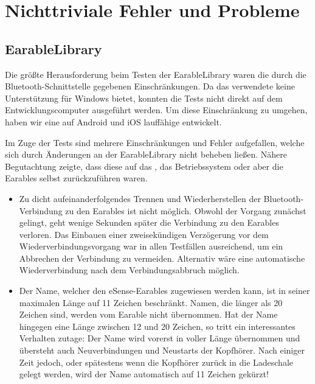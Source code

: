 \documentclass[../implementierung.tex]{subfiles}
\begin{document}
\section{Nichttriviale Fehler und Probleme}
\subsection{EarableLibrary}
Die größte Herausforderung beim Testen der EarableLibrary waren die durch die Bluetooth-Schnittstelle gegebenen Einschränkungen.
Da das verwendete  keine Unterstützung für Windows bietet, konnten die Tests nicht direkt auf dem Entwicklungscomputer ausgeführt werden.
Um diese Einschränkung zu umgehen, haben wir eine auf Android und iOS lauffähige  entwickelt.

Im Zuge der Tests sind mehrere Einschränkungen und Fehler aufgefallen, welche sich durch Änderungen an der EarableLibrary nicht beheben ließen.
Nähere Begutachtung zeigte, dass diese auf das , das Betriebssystem oder aber die Earables selbst zurückzuführen waren.
\begin{itemize}
\item Zu dicht aufeinanderfolgendes Trennen und Wiederherstellen der Bluetooth-Verbindung zu den Earables ist nicht möglich. Obwohl der Vorgang zunächst gelingt, geht wenige Sekunden später die Verbindung zu den Earables verloren.
Das Einbauen einer zweisekündigen Verzögerung vor dem Wiederverbindungsvorgang war in allen Testfällen ausreichend, um ein Abbrechen der Verbindung zu vermeiden.
Alternativ wäre eine automatische Wiederverbindung nach dem Verbindungsabbruch möglich.
\item Der Name, welcher den eSense-Earables zugewiesen werden kann, ist in seiner maximalen Länge auf 11 Zeichen beschränkt.
Namen, die länger als 20 Zeichen sind, werden vom Earable nicht übernommen.
Hat der Name hingegen eine Länge zwischen 12 und 20 Zeichen, so tritt ein interessantes Verhalten zutage:
Der Name wird vorerst in voller Länge übernommen und übersteht auch Neuverbindungen und Neustarts der Kopfhörer.
Nach einiger Zeit jedoch, oder spätestens wenn die Kopfhörer zurück in die Ladeschale gelegt werden, wird der Name automatisch auf 11 Zeichen gekürzt!
\end{itemize}
\end{document}
